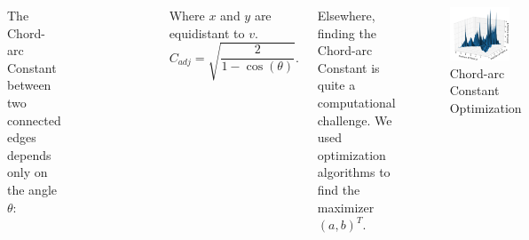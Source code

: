 \documentclass{beamer}
\begin{document}
\begin{frame}
\begin{columns}[t]
        The Chord-arc Constant between two connected edges depends only on the angle $\theta$:
        \begin{columns}
            \begin{figure}
                \includegraphics[width=1.1\textwidth]{figures/adj ca.jpg}
                \label{fig:adj_ca}
            \end{figure}
            Where $x$ and $y$ are equidistant to $v$.
            $$C_{adj}=\sqrt{\frac{2}{1 - \cos (\theta)}}.$$
        \end{columns}
        \vspace{-1.5cm}
        Elsewhere, finding the Chord-arc Constant is quite a computational challenge. We used optimization algorithms to find the maximizer $(a,b)^T$.
        \vspace{-1cm}
        \renewcommand{\thefigure}{3}
        \begin{figure}
            \centering
            \includegraphics[width=0.83\textwidth]{figures/opt_3d.png}
            \caption{Chord-arc Constant Optimization}%
            \label{fig:opt_3d}
        \end{figure}


\end{columns}
\end{frame}
\end{document}
